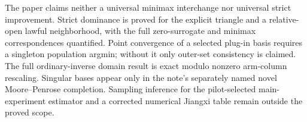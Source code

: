 The paper claims neither a universal minimax interchange nor universal strict improvement.  Strict dominance is proved for the explicit triangle and a relative-open lawful neighborhood, with the full zero-surrogate and minimax correspondences quantified.  Point convergence of a selected plug-in basis requires a singleton population argmin; without it only outer-set consistency is claimed.  The full ordinary-inverse domain result is exact modulo nonzero arm-column rescaling.  Singular bases appear only in the note's separately named novel Moore--Penrose completion.  Sampling inference for the pilot-selected main-experiment estimator and a corrected numerical Jiangxi table remain outside the proved scope.